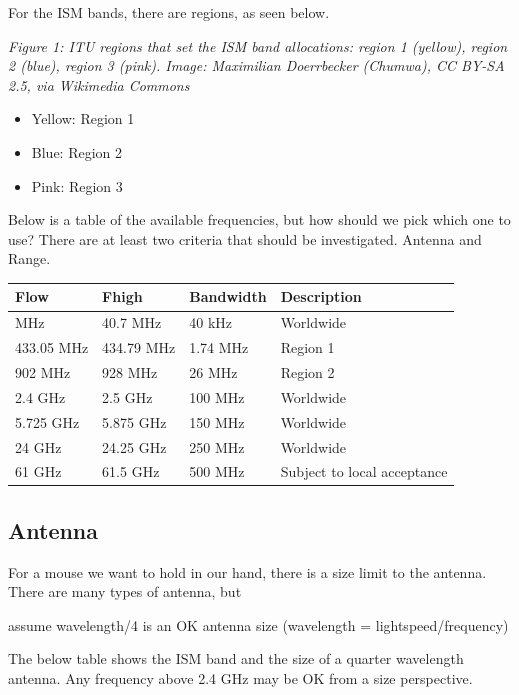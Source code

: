 For the ISM bands, there are regions, as seen below.


{
\centering
{}
}

\emph{Figure 1: ITU regions that set the ISM band allocations: region 1
(yellow), region 2 (blue), region 3 (pink). Image: Maximilian
Doerrbecker (Chumwa), CC BY-SA 2.5, via Wikimedia Commons}

\begin{itemize}
\tightlist
\item
  Yellow: Region 1
\item
  Blue: Region 2
\item
  Pink: Region 3
\end{itemize}

Below is a table of the available frequencies, but how should we pick
which one to use? There are at least two criteria that should be
investigated. Antenna and Range.

\begin{longtable}[]{@{}llll@{}}
\toprule\noalign{}
Flow & Fhigh & Bandwidth & Description \\
\midrule\noalign{}
\endhead
\bottomrule\noalign{}
\endlastfoot
40.66 MHz & 40.7 MHz & 40 kHz & Worldwide \\
433.05 MHz & 434.79 MHz & 1.74 MHz & Region 1 \\
902 MHz & 928 MHz & 26 MHz & Region 2 \\
2.4 GHz & 2.5 GHz & 100 MHz & Worldwide \\
5.725 GHz & 5.875 GHz & 150 MHz & Worldwide \\
24 GHz & 24.25 GHz & 250 MHz & Worldwide \\
61 GHz & 61.5 GHz & 500 MHz & Subject to local acceptance \\
\end{longtable}

\subsection{Antenna}\label{antenna}

For a mouse we want to hold in our hand, there is a size limit to the
antenna. There are many types of antenna, but

assume wavelength/4 is an OK antenna size (wavelength =
lightspeed/frequency)

The below table shows the ISM band and the size of a quarter wavelength
antenna. Any frequency above 2.4 GHz may be OK from a size perspective.

